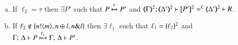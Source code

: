\begin{proposition}
\begin{enumerate}[1.]
\begin{enumerate}[a)]
				\item   
					If  %
					$\ell_2 = \tau$ 
					then $\exists P'$ such that
					$P \xmapsto{\tau} P'$
					and $\horel{\mapt{\Gamma}^{2}}{\mapt{\Delta'}^{2}}{\map{P'}^{2}}{\fwb}{\mapt{\Delta'}^{2}}{R}$.
				\item	 
					If  
					$\ell_2 \not\in \{n ! \langle m \rangle, n \oplus l, n \& l\}$ 
					 then 
					$\exists \ell_1$ such that 
					$\ell_1 = \{\!\!\{\ell_2\}\!\!\}^{2}$ and \\
					$ \Gamma ;\, \Delta  \vdash   P
					\xmapsto{\ell_1}
					\Gamma ;\, \Delta  \vdash   P'$.
		\end{enumerate}
	\end{enumerate}
\end{proposition}


